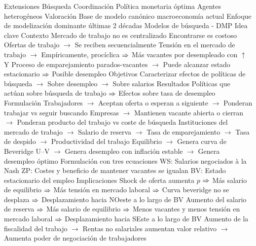 \documentclass{nuevotema}
\begin{document}
\begin{esquemal}
			\3 Extensiones
				\4 Búsqueda
				\4 Coordinación
				\4 Política monetaria óptima
				\4 Agentes heterogéneos
			\3 Valoración
				\4 Base de modelo canónico macroeconomía actual
				\4 Enfoque de modelización dominante últimas 2 décadas
		\2 Modelos de búsqueda - DMP
			\3 Idea clave
				\4 Contexto
				\4[] Mercado de trabajo no es centralizado
				\4[] Encontrarse es costoso
				\4[] Ofertas de trabajo
				\4[] $\to$ Se reciben secuencialmente
				\4[] Tensión en el mercado de trabajo
				\4[] $\to$ Empíricamente, procíclica
				\4[] $\Rightarrow$ Más vacantes por desempleado con $\uparrow$ Y
				\4[] Proceso de emparejamiento parados-vacantes
				\4[] $\to$ Puede alcanzar estado estacionario
				\4[] $\Rightarrow$ Posible desempleo
				\4 Objetivos
				\4[] Caracterizar efectos de políticas de búsqueda
				\4[] $\to$ Sobre desempleo
				\4[] $\to$ Sobre salarios
				\4 Resultados
				\4[] Políticas que actúan sobre búsqueda de trabajo
				\4[] $\Rightarrow$ Efectos sobre tasa de desempleo
			\3 Formulación
				\4[] Trabajadores
				\4[] $\to$ Aceptan oferta o esperan a siguiente
				\4[] $\to$ Ponderan trabajar vs seguir buscando
				\4[] Empresas
				\4[] $\to$ Mantienen vacante abierta o cierran
				\4[] $\to$ Ponderan producto del trabajo vs coste de búsqueda
				\4[] Instituciones del mercado de trabajo
				\4[] $\to$ Salario de reserva
				\4[] $\to$ Tasa de emparejamiento
				\4[] $\to$ Tasa de despido
				\4[] $\to$ Productividad del trabajo
				\4[] Equilibrio
				\4[] $\to$ Genera curva de Beveridge U--V
				\4[] $\to$ Genera desempleo con inflación estable
				\4[] $\to$ Genera desempleo óptimo
				\4[] Formulación con tres ecuaciones
				\4[] WS: Salarios negociados à la Nash
				\4[] 
				\4[] ZP: Costes y beneficio de mantener vacantes se igualan
				\4[] 
				\4[] BV: Estado estacionario del empleo
				\4[] 
			\3 Implicaciones
				\4 Shock de oferta aumenta $p$
				\4[] $\Rightarrow$ Más salario de equilibrio
				\4[] $\Rightarrow$ Más tensión en mercado laboral
				\4[] $\Rightarrow$ Curva beveridge no se desplaza
				\4[] $\Rightarrow$ Desplazamiento hacia NOeste a lo largo de BV
				\4 Aumento del salario de reserva
				\4[] $\Rightarrow$ Más salario de equilibrio
				\4[] $\Rightarrow$ Menos vacantes y menos tensión en mercado laboral
				\4[] $\Rightarrow$ Desplazamiento hacia SEste a lo largo de BV
				\4 Aumento de la fiscalidad del trabajo
				\4[] $\to$ Rentas no salariales aumentan valor relativo
				\4[] $\to$ Aumenta poder de negociación de trabajadores

\end{esquemal}
\end{document}
